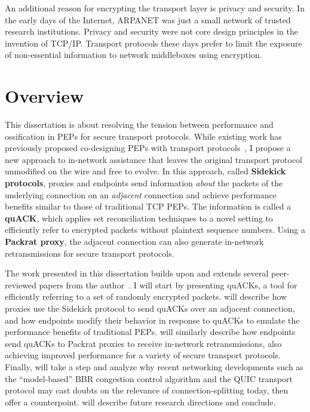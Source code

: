 An additional reason for encrypting the transport layer is privacy and security.
In the early days of the Internet, ARPANET was just a small network of trusted
research institutions. Privacy and security were not core design principles in
the invention of TCP/IP. Transport protocols these days prefer to limit the
exposure of non-essential information to network middleboxes using encryption.

\section{Overview}

This dissertation is about resolving the tension between performance and
ossification in PEPs for secure transport protocols. While existing work has
previously proposed co-designing PEPs with transport protocols~\cite{ford2008logjam,sherry2015blindbox, dogar2012tapa,iyengar2009flow},
I propose a new
approach to in-network assistance that leaves the original transport protocol
unmodified on the wire and free to evolve. In this approach, called \textbf
{Sidekick protocols}, proxies and endpoints send information \textit{about} the
packets of the underlying connection on an \textit{adjacent} connection and
achieve performance benefits similar to those of traditional TCP PEPs. The
information is called a \textbf{quACK}, which applies set reconciliation
techniques to a novel setting to efficiently refer to encrypted packets without
plaintext sequence numbers. Using a \textbf{Packrat proxy}, the adjacent
connection can also generate in-network retransmissions for secure transport
protocols.

The work presented in this dissertation builds upon and extends several
peer-reviewed papers from the author~\cite{yuan2022sidecar,yuan2024sidekick,yuan2025internet}.
I will start  by presenting quACKs, a tool for efficiently
referring to a set of randomly encrypted packets.
 will describe how proxies use the Sidekick protocol to send
quACKs over an adjacent connection, and how endpoints modify their behavior in
response to quACKs to emulate the performance benefits of traditional
PEPs.
 will similarly describe how endpoints send quACKs to Packrat
proxies to receive in-network retransmissions, also achieving improved
performance for a variety of secure transport protocols.
Finally,  will take a step and analyze why recent networking
developments such as the ``model-based'' BBR congestion control algorithm and
the QUIC transport protocol may cast doubts on the relevance of
connection-splitting today, then offer a counterpoint.
 will describe future research directions and conclude.

